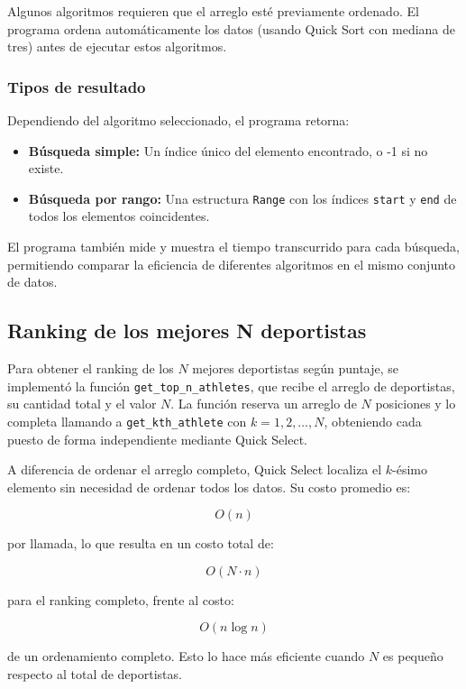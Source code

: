 Algunos algoritmos requieren que el arreglo esté previamente ordenado. El programa ordena automáticamente los datos (usando Quick Sort con mediana de tres) antes de ejecutar estos algoritmos.

\subsubsection{Tipos de resultado}

Dependiendo del algoritmo seleccionado, el programa retorna:

\begin{itemize}
    \item \textbf{Búsqueda simple:} Un índice único del elemento encontrado, o -1 si no existe.
    \item \textbf{Búsqueda por rango:} Una estructura \texttt{Range} con los índices \texttt{start} y \texttt{end} de todos los elementos coincidentes.
\end{itemize}

El programa también mide y muestra el tiempo transcurrido para cada búsqueda, permitiendo comparar la eficiencia de diferentes algoritmos en el mismo conjunto de datos.

\subsection{Ranking de los mejores N deportistas}
Para obtener el ranking de los \(N\) mejores deportistas según puntaje, se implementó la función \texttt{get\_top\_n\_athletes}, que recibe el arreglo de deportistas, su cantidad total y el valor \(N\). La función reserva un arreglo de \(N\) posiciones y lo completa llamando a \texttt{get\_kth\_athlete} con \(k = 1, 2, \ldots, N\), obteniendo cada puesto de forma independiente mediante Quick Select.

A diferencia de ordenar el arreglo completo, Quick Select localiza el \(k\)-ésimo elemento sin necesidad de ordenar todos los datos. Su costo promedio es:

\[
O(n)
\]

por llamada, lo que resulta en un costo total de:

\[
O(N \cdot n)
\]

para el ranking completo, frente al costo:

\[
O(n \log n)
\]

de un ordenamiento completo. Esto lo hace más eficiente cuando \(N\) es pequeño respecto al total de deportistas.

